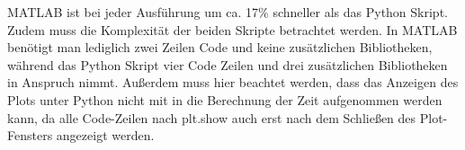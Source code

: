MATLAB ist bei jeder Ausführung um ca. 17\% schneller als das Python Skript. Zudem muss die Komplexität der beiden Skripte betrachtet werden. In MATLAB benötigt man lediglich zwei Zeilen Code und keine zusätzlichen Bibliotheken, während das Python Skript  vier Code Zeilen und drei zusätzlichen Bibliotheken in Anspruch nimmt. Außerdem muss hier beachtet werden, dass das Anzeigen des Plots unter Python nicht mit in die Berechnung der Zeit aufgenommen werden kann, da alle Code-Zeilen nach \glqq plt.show\grqq{} auch erst nach dem Schließen des Plot-Fensters angezeigt werden.

